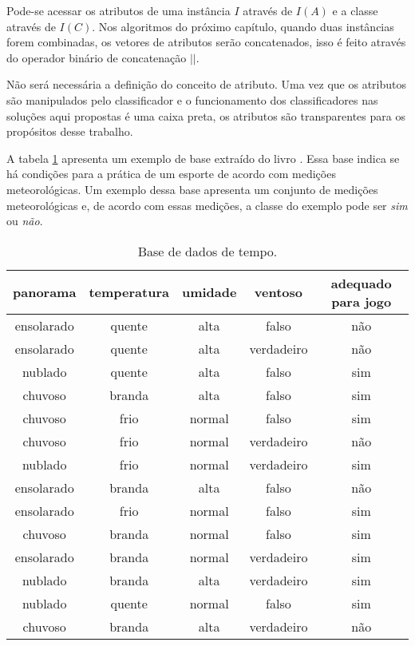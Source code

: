 Pode-se acessar os atributos de uma instância $I$ através de $I(A)$ e a classe através de $I(C)$. Nos algoritmos do próximo capítulo, quando duas instâncias forem combinadas, os vetores de atributos serão concatenados, isso é feito através do operador binário de concatenação $||$.

Não será necessária a definição do conceito de atributo. Uma vez que os atributos são manipulados pelo classificador e o funcionamento dos classificadores nas soluções aqui propostas é uma caixa preta, os atributos são transparentes para os propósitos desse trabalho.

A tabela \ref{tab:weather} apresenta um exemplo de base extraído do livro \cite{wekabook}. Essa base indica se há condições para a prática de um esporte de acordo com medições meteorológicas. Um exemplo dessa base apresenta um conjunto de medições meteorológicas e, de acordo com essas medições, a classe do exemplo pode ser \emph{sim} ou \emph{não}.

\begin{table}[h!]
    \centering
    \begin{tabular}{ccccc}
        \hline
        panorama & temperatura & umidade & ventoso & adequado para jogo \\
        \hline
        ensolarado & quente & alta & falso & não \\
        ensolarado & quente & alta & verdadeiro & não \\
        nublado & quente & alta & falso & sim \\
        chuvoso & branda & alta & falso & sim \\
        chuvoso & frio & normal & falso & sim \\
        chuvoso & frio & normal & verdadeiro & não \\
        nublado & frio & normal & verdadeiro & sim \\
        ensolarado & branda & alta & falso & não \\
        ensolarado & frio & normal & falso & sim \\
        chuvoso & branda & normal & falso & sim \\
        ensolarado & branda & normal & verdadeiro & sim \\
        nublado & branda & alta & verdadeiro & sim \\
        nublado & quente & normal & falso & sim \\
        chuvoso & branda & alta & verdadeiro & não \\
        \hline
    \end{tabular}

    \caption{Base de dados de tempo. \label{tab:weather}}
\end{table}


